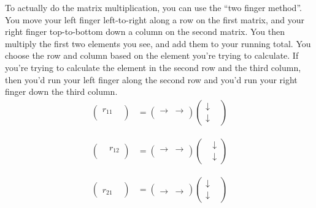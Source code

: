 \documentclass{article}
\begin{document}
To actually do the matrix multiplication, you can use the ``two finger method''.
You move your left finger left-to-right along a row on the first matrix, and your right finger top-to-bottom down a column on the second matrix.
You then multiply the first two elements you see, and add them to your running total.
You choose the row and column based on the element you're trying to calculate.
If you're trying to calculate the element in the second row and the third column, then you'd run your left finger along the second row and you'd run your right finger down the third column.
\begin{align}
  \begin{pmatrix}
    r_{11} & \\
      &
  \end{pmatrix} &= 
  \begin{pmatrix}
  \rightarrow & \rightarrow \\
              &
  \end{pmatrix}
  \begin{pmatrix}
    \downarrow & \\
    \downarrow &
  \end{pmatrix}
\end{align}

\begin{align}
  \begin{pmatrix}
      & r_{12}\\
      &
  \end{pmatrix} &= 
  \begin{pmatrix}
  \rightarrow & \rightarrow \\
              &
  \end{pmatrix}
  \begin{pmatrix}
    & \downarrow \\
    & \downarrow 
  \end{pmatrix}
\end{align}

\begin{align}
  \begin{pmatrix}
      & \\
    r_{21} &
  \end{pmatrix} &= 
  \begin{pmatrix}
  & \\
   \rightarrow & \rightarrow 
  \end{pmatrix}
  \begin{pmatrix}
    \downarrow & \\
    \downarrow & 
  \end{pmatrix}
\end{align}
\end{document}
